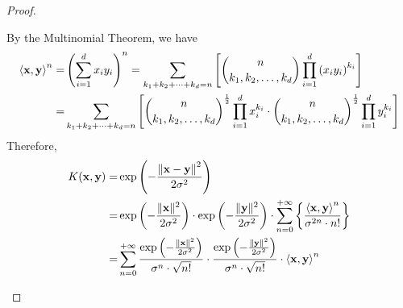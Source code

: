 \begin{proof}
\begin{enumerate}
		      By the Multinomial Theorem, we have
		      \begin{equation*}
			      \begin{aligned}
				      \left\langle\mathbf{x},\mathbf{y}\right\rangle^{n}= & \left(\sum_{i=1}^{d}x_{i}y_{i}\right)^{n}=\sum_{k_{1}+k_{2}+\cdots+k_{d}=n}\left[\binom{n}{k_{1},k_{2},\ldots,k_{d}}\prod_{i=1}^{d}\left(x_{i}y_{i}\right)^{k_{i}}\right]                                     \\
				      =                                             & \sum_{k_{1}+k_{2}+\cdots+k_{d}=n}\left[\binom{n}{k_{1},k_{2},\ldots,k_{d}}^{\frac{1}{2}}\prod_{i=1}^{d}x_{i}^{k_{i}}\cdot\binom{n}{k_{1},k_{2},\ldots,k_{d}}^{\frac{1}{2}}\prod_{i=1}^{d}y_{i}^{k_{i}}\right] \\
			      \end{aligned}
		      \end{equation*}
		      Therefore,
		      \begin{equation*}
			      \begin{aligned}
				      K(\mathbf{x},\mathbf{y})= & \exp\left(-\frac{\left\|\mathbf{x}-\mathbf{y}\right\|^{2}}{2\sigma^{2}}\right)                                                                                                                                                                               \\
				      =                   & \exp\left(-\frac{\|\mathbf{x}\|^{2}}{2\sigma^{2}}\right)\cdot\exp\left(-\frac{\|\mathbf{y}\|^{2}}{2\sigma^{2}}\right)\cdot\sum_{n=0}^{+\infty}\left\{\frac{\left\langle\mathbf{x},\mathbf{y}\right\rangle^{n}}{\sigma^{2n}\cdot n!}\right\}                        \\
				      =                   & \sum_{n=0}^{+\infty}\frac{\exp\left(-\frac{\|\mathbf{x}\|^{2}}{2\sigma^{2}}\right)}{\sigma^{n}\cdot\sqrt{n!}}\cdot\frac{\exp\left(-\frac{\|\mathbf{y}\|^{2}}{2\sigma^{2}}\right)}{\sigma^{n}\cdot\sqrt{n!}}\cdot\left\langle\mathbf{x},\mathbf{y}\right\rangle^{n}
			      \end{aligned}
		      \end{equation*}


\end{enumerate}
\end{proof}
